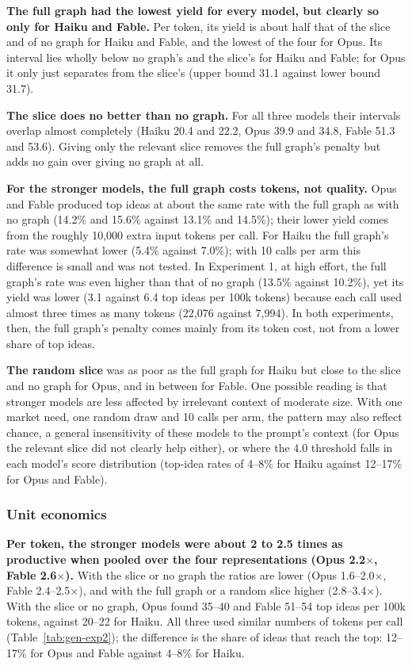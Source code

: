 \textbf{The full graph had the lowest yield for every model, but clearly so only for Haiku and Fable.} Per token, its yield is about half that of the slice and of no graph for Haiku and Fable, and the lowest of the four for Opus. Its interval lies wholly below no graph's and the slice's for Haiku and Fable; for Opus it only just separates from the slice's (upper bound 31.1 against lower bound 31.7).

\textbf{The slice does no better than no graph.} For all three models their intervals overlap almost completely (Haiku 20.4 and 22.2, Opus 39.9 and 34.8, Fable 51.3 and 53.6). Giving only the relevant slice removes the full graph's penalty but adds no gain over giving no graph at all.

\textbf{For the stronger models, the full graph costs tokens, not quality.} Opus and Fable produced top ideas at about the same rate with the full graph as with no graph (14.2\% and 15.6\% against 13.1\% and 14.5\%); their lower yield comes from the roughly 10,000 extra input tokens per call. For Haiku the full graph's rate was somewhat lower (5.4\% against 7.0\%); with 10 calls per arm this difference is small and was not tested. In Experiment 1, at high effort, the full graph's rate was even higher than that of no graph (13.5\% against 10.2\%), yet its yield was lower (3.1 against 6.4 top ideas per 100k tokens) because each call used almost three times as many tokens (22,076 against 7,994). In both experiments, then, the full graph's penalty comes mainly from its token cost, not from a lower share of top ideas.

\textbf{The random slice} was as poor as the full graph for Haiku but close to the slice and no graph for Opus, and in between for Fable. One possible reading is that stronger models are less affected by irrelevant context of moderate size. With one market need, one random draw and 10 calls per arm, the pattern may also reflect chance, a general insensitivity of these models to the prompt's context (for Opus the relevant slice did not clearly help either), or where the 4.0 threshold falls in each model's score distribution (top-idea rates of 4--8\% for Haiku against 12--17\% for Opus and Fable).

\subsubsection{Unit economics}\label{rq4-economics}

\textbf{Per token, the stronger models were about 2 to 2.5 times as productive when pooled over the four representations (Opus 2.2$\times$, Fable 2.6$\times$).} With the slice or no graph the ratios are lower (Opus 1.6--2.0$\times$, Fable 2.4--2.5$\times$), and with the full graph or a random slice higher (2.8--3.4$\times$). With the slice or no graph, Opus found 35--40 and Fable 51--54 top ideas per 100k tokens, against 20--22 for Haiku. All three used similar numbers of tokens per call (Table~\ref{tab:gen-exp2}); the difference is the share of ideas that reach the top: 12--17\% for Opus and Fable against 4--8\% for Haiku.

